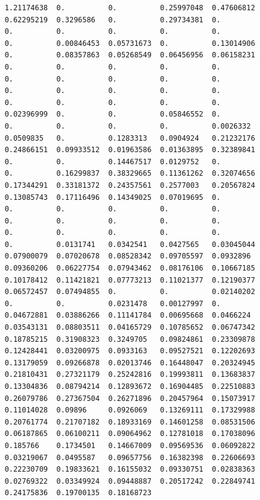 \documentclass[12pt]{amsart}
\theoremstyle{definition}
\begin{document}
{\footnotesize
\begin{verbatim}
    1.21174638  0.          0.          0.25997048  0.47606812
    0.62295219  0.3296586   0.          0.29734381  0.
    0.          0.          0.          0.          0.
    0.          0.00846453  0.05731673  0.          0.13014906
    0.          0.08357863  0.05268549  0.06456956  0.06158231
    0.          0.          0.          0.          0.
    0.          0.          0.          0.          0.
    0.          0.          0.          0.          0.
    0.          0.          0.          0.          0.
    0.02396999  0.          0.          0.05846552  0.
    0.          0.          0.          0.          0.0026332
    0.0509835   0.          0.1283313   0.0904924   0.21232176
    0.24866151  0.09933512  0.01963586  0.01363895  0.32389841
    0.          0.          0.14467517  0.0129752   0.
    0.          0.16299837  0.38329665  0.11361262  0.32074656
    0.17344291  0.33181372  0.24357561  0.2577003   0.20567824
    0.13085743  0.17116496  0.14349025  0.07019695  0.
    0.          0.          0.          0.          0.
    0.          0.          0.          0.          0.
    0.          0.          0.          0.          0.
    0.          0.0131741   0.0342541   0.0427565   0.03045044
    0.07900079  0.07020678  0.08528342  0.09705597  0.0932896
    0.09360206  0.06227754  0.07943462  0.08176106  0.10667185
    0.10178412  0.11421821  0.07773213  0.11021377  0.12190377
    0.06572457  0.07494855  0.          0.          0.02140202
    0.          0.          0.0231478   0.00127997  0.
    0.04672881  0.03886266  0.11141784  0.00695668  0.0466224
    0.03543131  0.08803511  0.04165729  0.10785652  0.06747342
    0.18785215  0.31908323  0.3249705   0.09824861  0.23309878
    0.12428441  0.03200975  0.0933163   0.09527521  0.12202693
    0.13179059  0.09266878  0.02013746  0.16448047  0.20324945
    0.21810431  0.27321179  0.25242816  0.19993811  0.13683837
    0.13304836  0.08794214  0.12893672  0.16904485  0.22510883
    0.26079786  0.27367504  0.26271896  0.20457964  0.15073917
    0.11014028  0.09896     0.0926069   0.13269111  0.17329988
    0.20761774  0.21707182  0.18933169  0.14601258  0.08531506
    0.06187865  0.06100211  0.09064962  0.12781018  0.17038096
    0.185766    0.1734501   0.14667009  0.09569536  0.06092822
    0.03219067  0.0495587   0.09657756  0.16382398  0.22606693
    0.22230709  0.19833621  0.16155032  0.09330751  0.02838363
    0.02769322  0.03349924  0.09448887  0.20517242  0.22849741
    0.24175836  0.19700135  0.18168723
\end{verbatim}
}
\end{document}
